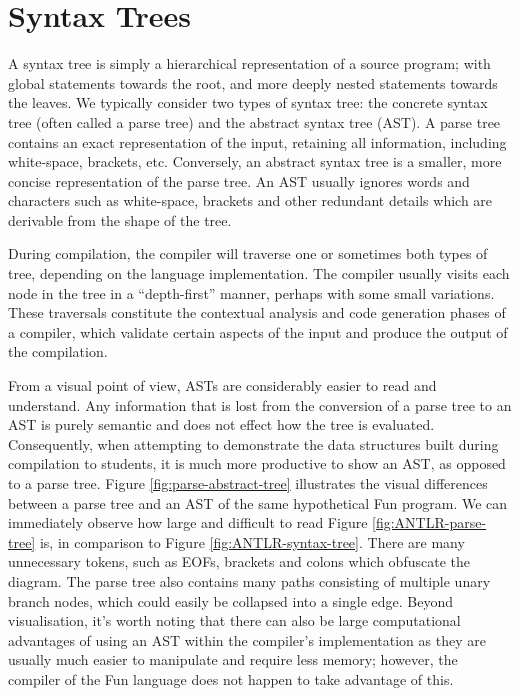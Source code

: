\documentclass{l4proj}
\begin{document}
\section{Syntax Trees}
A syntax tree is simply a hierarchical representation of a source program; with global statements towards the root, and more deeply nested statements towards the leaves. We typically consider two types of syntax tree: the concrete syntax tree (often called a parse tree) and the abstract syntax tree (AST). A parse tree contains an exact representation of the input, retaining all information, including white-space, brackets, etc. Conversely, an abstract syntax tree is a smaller, more concise representation of the parse tree. An AST usually ignores words and characters such as white-space, brackets and other redundant details which are derivable from the shape of the tree. 

During compilation, the compiler will traverse one or sometimes both types of tree, depending on the language implementation. The compiler usually visits each node in the tree in a ``depth-first'' manner, perhaps with some small variations. These traversals constitute the contextual analysis and code generation phases of a compiler, which validate certain aspects of the input and produce the output of the compilation. 

From a visual point of view, ASTs are considerably easier to read and understand. Any information that is lost from the conversion of a parse tree to an AST is purely semantic and does not effect how the tree is evaluated. Consequently, when attempting to demonstrate the data structures built during compilation to students, it is much more productive to show an AST, as opposed to a parse tree. Figure \ref{fig:parse-abstract-tree} illustrates the visual differences between a parse tree and an AST of the same hypothetical Fun program. We can immediately observe how large and difficult to read Figure \ref{fig:ANTLR-parse-tree} is, in comparison to Figure \ref{fig:ANTLR-syntax-tree}. There are many unnecessary tokens, such as EOFs, brackets and colons which obfuscate the diagram. The parse tree also contains many paths consisting of multiple unary branch nodes, which could easily be collapsed into a single edge. Beyond visualisation, it's worth noting that there can  also be large computational advantages of using an AST within the compiler's implementation as they are usually much easier to manipulate and require less memory; however, the compiler of the Fun language does not happen to take advantage of this. 
\end{document}
